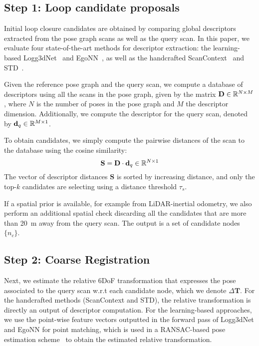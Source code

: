 \subsection*{\textbf{Step 1: Loop candidate proposals}}
\label{subsubsec:loop-candidate}
Initial loop closure candidates are obtained by comparing global descriptors extracted from the pose graph scans as well as the query scan. In this paper, we evaluate four state-of-the-art methods for descriptor extraction: the learning-based Logg3dNet~\cite{vidanapathirana2022icra} and EgoNN~\cite{komorowski2022ral}, as well as the handcrafted ScanContext~\cite{kim2018iros} and STD~\cite{yuan2023icra}.

Given the reference pose graph and the query scan, we compute a database of descriptors using all the scans in the pose graph, given by the matrix $\mathbf{D} \in \mathbb{R}^{N\times M}$, where $N$ is the number of poses in the pose graph and $M$ the descriptor dimension. Additionally, we compute the descriptor for the query scan, denoted by $\mathbf{d}_{q} \in \mathbb{R}^{M \times 1}$. 

To obtain candidates, we simply compute the pairwise distances of the scan to the database using the cosine similarity:
\begin{equation}
  \mathbf{S} = \mathbf{D} \cdot \mathbf{d}_{q} \in \mathbb{R}^{N \times 1}
\end{equation}
The vector of descriptor distances $\mathbf{S}$ is sorted by increasing distance, and only the top-$k$ candidates are selecting using a distance threshold $\tau_{s}$.

If a spatial prior is available, for example from LiDAR-inertial odometry, we also perform an additional spatial check discarding all the candidates that are more than \SI{20}{\meter} away from the query scan. The output is a set of candidate nodes $\{ n_c\}$.

\subsection*{\textbf{Step 2: Coarse Registration}}
\label{subsubsec:coarse-registration}
Next, we estimate the relative 6DoF transformation that expresses the pose associated to the query scan w.r.t each candidate node, which we denote $\Delta \mathbf{T}$. For the handcrafted methods (ScanContext and STD), the relative transformation is directly an output of descriptor computation. For the learning-based approaches, we use the point-wise feature vectors outputted in the forward pass of Logg3dNet and EgoNN for point matching, which is used in a RANSAC-based pose estimation scheme~\cite{fischler1981ransac} to obtain the estimated relative transformation.

